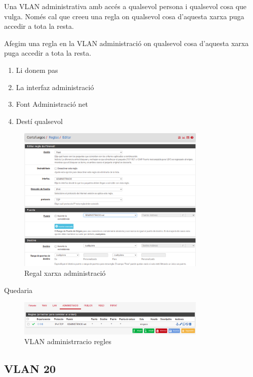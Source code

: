 \documentclass[
  10pt,
]{krantz}
\providecommand{\tightlist}{%
  \setlength{\itemsep}{0pt}\setlength{\parskip}{0pt}}
\begin{document}
Una VLAN administrativa amb accés a qualsevol persona i qualsevol cosa que vulga. Només cal que creeu una regla on qualsevol cosa d'aquesta xarxa puga accedir a tota la resta.

Afegim una regla en la VLAN administració on qualsevol cosa d'aquesta xarxa puga accedir a tota la resta.

\begin{enumerate}
\def\labelenumi{\arabic{enumi}.}
\tightlist
\item
  Li donem pas
\item
  La interfaz administració
\item
  Font Administració net
\item
  Destí qualsevol
\end{enumerate}

\begin{figure}
\centering
\includegraphics[width=0.8\textwidth,height=\textheight]{imatges/proxmox/regla_admin.png}
\caption{Regal xarxa administració}
\end{figure}

Quedaria

\begin{figure}
\centering
\includegraphics[width=0.8\textwidth,height=\textheight]{imatges/proxmox/regla_admin1.png}
\caption{VLAN administrracio regles}
\end{figure}

\hypertarget{vlan-20}{%
\subsection{VLAN 20}\label{vlan-20}}
\end{document}

